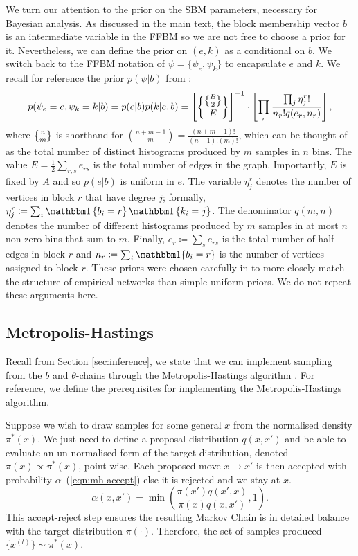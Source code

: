 We turn our attention to the prior on the SBM parameters, necessary for Bayesian analysis. As discussed in the main text, the block membership vector $b$ is an intermediate variable in the FFBM so we are not free to choose a prior for it. Nevertheless, we can define the prior on $(e,k)$ as a conditional on $b$. We switch back to the FFBM notation of $\psi = \{\psi_e, \psi_k\}$ to encapsulate $e$ and $k$. We recall for reference
the prior $p(\psi | b)$ from \cite{Peixoto-Bayesian-Microcanonical}:
%
\begin{equation}
	p(\psi_e=e, \psi_k=k | b) = p(e | b) p(k | e, b) = \left[ \specialchoose{ \specialchoose{B}{2} }{ E} \right]^{-1} 
	\cdot \left[ \prod_r \frac{\prod_j \eta_j^r !}{n_r! q(e_r, n_r)} \right],
\end{equation}
%
where $\specialchoose{n}{m}$ is shorthand 
for $\binom{n+m-1}{m} = \frac{(n+m-1)!}{(n-1)!(m)!}$,
which can be thought of as the total number of distinct histograms 
produced by $m$ samples in $n$ bins.
The value
$E = \frac{1}{2} \sum_{r,s} e_{rs}$ is the total number of edges in the graph. 
Importantly, $E$ is fixed by $A$ and so $p(e|b)$ is uniform in $e$.
The variable $\eta_j^r$ denotes the number of vertices in block $r$ 
that have degree $j$; formally, $\eta_j^r \coloneqq \sum_{i} \one\left\{b_i = r \right\} \one \left\{k_i = j \right\}$. 
The denominator $q(m, n)$ denotes the number of different histograms 
produced by $m$ samples in 
at most $n$ non-zero bins that sum to $m$. 
Finally, $e_r \coloneqq \sum_{s} e_{rs}$ is the total number 
of half edges in block $r$ and $n_r \coloneqq \sum_{i} \one\{b_i = r\}$ 
is the number of vertices assigned to block $r$.
These priors were chosen carefully in \cite{Peixoto-Bayesian-Microcanonical} to 
more closely match the structure of empirical networks than simple 
uniform priors. We do not repeat these arguments here.

\subsection{Metropolis-Hastings}
\label{appdx:metropolis-hastings}

Recall from Section \ref{sec:inference}, we state that we can implement sampling from the $b$ and $\theta$-chains through the Metropolis-Hastings algorithm \cite{hastings-alg}. For reference, we define the prerequisites for implementing the Metropolis-Hastings algorithm.

Suppose we wish to draw samples for some general $x$ from the normalised density $\pi^*(x)$. We just need to define a proposal distribution $q(x, x')$ and be able to evaluate an un-normalised form of the target distribution, denoted $\pi(x) \propto \pi^*(x)$, point-wise. Each proposed move $x \rightarrow x'$ is then accepted with probability $\alpha$~(\ref{eqn:mh-accept}) else it is rejected and we stay at $x$.
%
\begin{equation}
\alpha(x, x') = \min \left( \frac{\pi(x') q(x', x)}{\pi(x) q(x, x')} , 1 \right).
\label{eqn:mh-accept}
\end{equation}
%
This accept-reject step ensures the resulting Markov Chain is in detailed balance with the target distribution $\pi(\cdot)$. Therefore, the set of samples produced $\{x^{(t)}\} \sim \pi^*(x)$.

